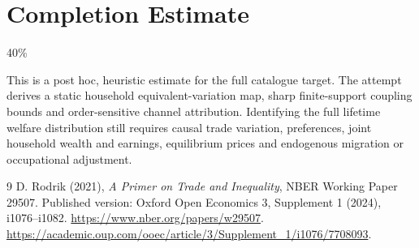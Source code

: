 \documentclass[11pt]{article}
\theoremstyle{definition}
\begin{document}
\section{Completion Estimate}
40\%

This is a post hoc, heuristic estimate for the full catalogue target.
The attempt derives a static household equivalent-variation map, sharp finite-support coupling bounds and order-sensitive channel attribution. Identifying the full lifetime welfare distribution still requires causal trade variation, preferences, joint household wealth and earnings, equilibrium prices and endogenous migration or occupational adjustment.

\begin{thebibliography}{9}
 D. Rodrik (2021), \emph{A Primer on Trade and Inequality},
NBER Working Paper 29507. Published version: Oxford Open Economics 3,
Supplement 1 (2024), i1076--i1082.
\url{https://www.nber.org/papers/w29507}.
\url{https://academic.oup.com/ooec/article/3/Supplement_1/i1076/7708093}.
\end{thebibliography}
\end{document}
